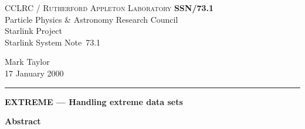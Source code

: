 \documentclass[twoside,11pt]{article}
\newcommand{\stardoccategory}  {Starlink System Note}
\newcommand{\stardocinitials}  {SSN}
\newcommand{\stardocnumber}    {73.1}
\newcommand{\stardocauthors}   {Mark Taylor}
\newcommand{\stardocdate}      {17 January 2000}
\newcommand{\stardoctitle}     {EXTREME --- Handling extreme data sets}
\newcommand{\stardocname}{\stardocinitials /\stardocnumber}
\newenvironment{latexonly}{}{}
\renewcommand{\_}{\texttt{\symbol{95}}}
\begin{document}
\thispagestyle{empty}

\begin{latexonly}
   CCLRC / \textsc{Rutherford Appleton Laboratory} \hfill \textbf{\stardocname}\\
   {\large Particle Physics \& Astronomy Research Council}\\
   {\large Starlink Project\\}
   {\large \stardoccategory\ \stardocnumber}
   \begin{flushright}
   \stardocauthors\\
   \stardocdate
   \end{flushright}
   \vspace{-4mm}
   \rule{\textwidth}{0.5mm}
   \vspace{5mm}
   \begin{center}
   {\Large\textbf{\stardoctitle}}
   \end{center}
   \vspace{5mm}

   \vspace{10mm}
   \begin{center}
      {\Large\textbf{Abstract}}
   \end{center}
\end{latexonly}
\end{document}
